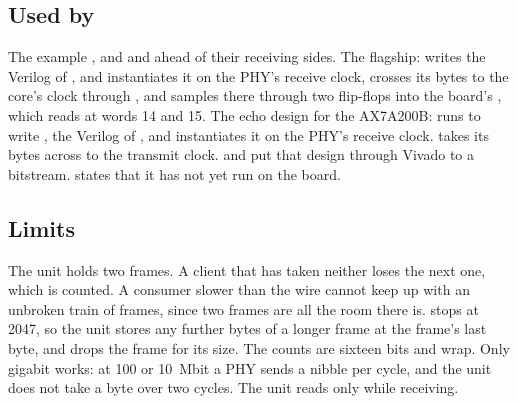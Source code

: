 \subsection*{Used by}

The example , and  and 
ahead of their receiving sides. The flagship:  writes
the Verilog of , and 
instantiates it on the PHY's receive clock, crosses its bytes to the
core's clock through , and samples 
there through two flip-flops into the board's , which
 reads at words 14 and 15. The echo design for the
AX7A200B:
 runs  to write
, the Verilog of , and
 instantiates it on the PHY's receive
clock.  takes its bytes across to the
transmit clock.  and  put
that design through Vivado to a bitstream.  states
that it has not yet run on the board.

\subsection*{Limits}

The unit holds two frames. A client that has taken neither loses the
next one, which is counted. A consumer slower than the wire cannot keep
up with an unbroken train of frames, since two frames are all the room
there is.  stops at 2047, so the unit stores any further
bytes of a longer frame at the frame's last byte, and drops the frame
for its size. The counts are sixteen bits and wrap. Only gigabit works:
at 100 or 10~Mbit a PHY sends a nibble per cycle, and the unit does not
take a byte over two cycles. The unit reads  only while
receiving.
